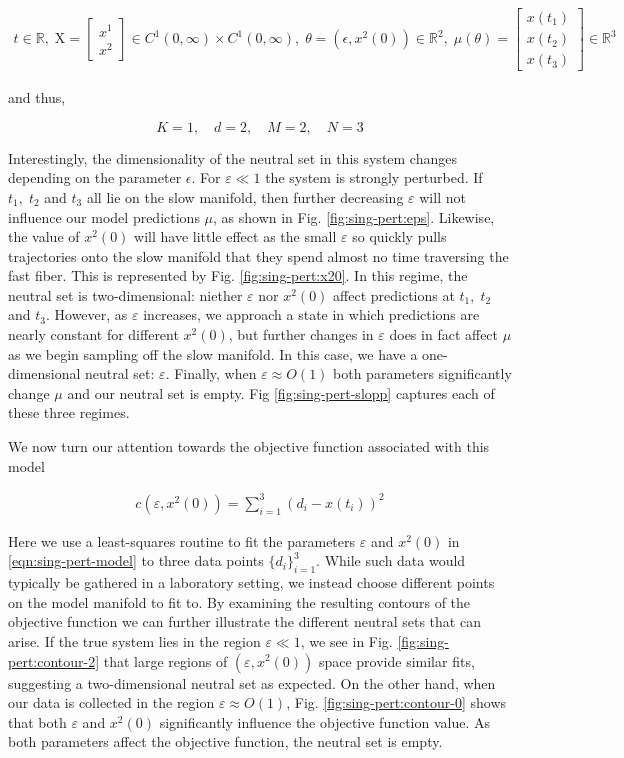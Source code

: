 \documentclass{article}
\newcommand{\eps}{\varepsilon}
\newcommand{\fms}{\mathrm{X}}
\begin{document}
\begin{align*}
t \in \mathbb{R}, \; \fms =  \begin{bmatrix} x^1 \\ x^2 \end{bmatrix} \in C^1(0,\infty) \times C^1(0,\infty), \; \theta = (\epsilon, x^2(0)) \in \mathbb{R}^2, \; \mu(\theta) = \begin{bmatrix} x(t_1) \\ x(t_2) \\ x(t_3) \end{bmatrix} \in \mathbb{R}^3
\end{align*}

and thus,

%
\[
 K=1 ,
\quad
 d = 2 ,
\quad
 M = 2 ,
\quad
 N = 3
\]
%


Interestingly, the dimensionality of the neutral set in this system
changes depending on the parameter $\epsilon$. For $\eps \ll 1$ the
system is strongly perturbed. If $t_1, \; t_2$ and $t_3$ all lie on
the slow manifold, then further decreasing $\eps$ will not influence
our model predictions $\mu$, as shown in
Fig. \ref{fig:sing-pert:eps}. Likewise, the value of $x^2(0)$ will
have little effect as the small $\eps$ so quickly pulls trajectories
onto the slow manifold that they spend almost no time traversing the
fast fiber. This is represented by Fig. \ref{fig:sing-pert:x20}. In
this regime, the neutral set is two-dimensional: niether $\eps$ nor
$x^2(0)$ affect predictions at $t_1, \; t_2$ and $t_3$. However, as
$\eps$ increases, we approach a state in which predictions are nearly
constant for different $x^2(0)$, but further changes in $\eps$ does in
fact affect $\mu$ as we begin sampling off the slow manifold. In this
case, we have a one-dimensional neutral set: $\eps$. Finally, when
$\eps \approx O(1)$ both parameters significantly change $\mu$ and our
neutral set is empty. Fig \ref{fig:sing-pert-slopp} captures each of
these three regimes.

We now turn our attention towards the objective function associated
with this model

\begin{align*}
  c(\eps, x^2(0)) = \sum_{i=1}^3 (d_i - x(t_i))^2
\end{align*}

Here we use a least-squares routine to fit the parameters $\eps$ and
$x^2(0)$ in \ref{eqn:sing-pert-model} to three data points
$\{d_i\}_{i=1}^3$. While such data would typically be gathered in a
laboratory setting, we instead choose different points on the model
manifold to fit to. By examining the resulting contours of the
objective function we can further illustrate the different neutral
sets that can arise. If the true system lies in the region
$\eps \ll 1$, we see in Fig. \ref{fig:sing-pert:contour-2} that large
regions of $(\eps, x^2(0))$ space provide similar fits, suggesting a
two-dimensional neutral set as expected. On the other hand, when our
data is collected in the region $\eps \approx O(1)$,
Fig. \ref{fig:sing-pert:contour-0} shows that both $\eps$ and $x^2(0)$
significantly influence the objective function value. As both
parameters affect the objective function, the neutral set is empty.
\end{document}
